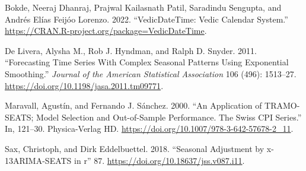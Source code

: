 \documentclass[
]{article}
\newlength{\cslhangindent}
\newlength{\cslentryspacingunit} %
\newenvironment{CSLReferences}[2] %
 {%
  \setlength{\parindent}{0pt}
  \ifodd #1
  \let\oldpar\par
  \def\par{\hangindent=\cslhangindent\oldpar}
  \fi
  \setlength{\parskip}{#2\cslentryspacingunit}
 }%
 {}
\begin{document}
\hypertarget{refs}{}
\begin{CSLReferences}{1}{0}
\leavevmode{}%
Bokde, Neeraj Dhanraj, Prajwal Kailasnath Patil, Saradindu Sengupta, and
Andrés Elías Feijóo Lorenzo. 2022. {``VedicDateTime: Vedic Calendar
System.''} \url{https://CRAN.R-project.org/package=VedicDateTime}.

\leavevmode{}%
De Livera, Alysha M., Rob J. Hyndman, and Ralph D. Snyder. 2011.
{``Forecasting Time Series With Complex Seasonal Patterns Using
Exponential Smoothing.''} \emph{Journal of the American Statistical
Association} 106 (496): 1513--27.
\url{https://doi.org/10.1198/jasa.2011.tm09771}.

\leavevmode{}%
Maravall, Agustín, and Fernando J. Sánchez. 2000. {``An Application of
TRAMO-SEATS; Model Selection and Out-of-Sample Performance. The Swiss
CPI Series.''} In, 121--30. Physica-Verlag HD.
\url{https://doi.org/10.1007/978-3-642-57678-2_11}.

\leavevmode{}%
Sax, Christoph, and Dirk Eddelbuettel. 2018. {``Seasonal Adjustment by
{\textbraceleft}x-13ARIMA-SEATS{\textbraceright} in
{\textbraceleft}r{\textbraceright}''} 87.
\url{https://doi.org/10.18637/jss.v087.i11}.

\end{CSLReferences}
\end{document}
